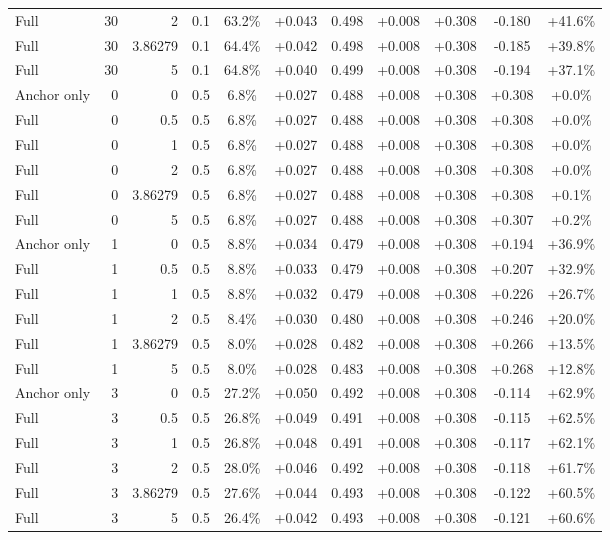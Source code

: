 \begin{table}[htbp]
\begin{tabular}{lrrrccccccc}
Full & 30 & 2 & 0.1 & 63.2\% & +0.043 & 0.498 & +0.008 & +0.308 & -0.180 & +41.6\% \\
Full & 30 & 3.86279 & 0.1 & 64.4\% & +0.042 & 0.498 & +0.008 & +0.308 & -0.185 & +39.8\% \\
Full & 30 & 5 & 0.1 & 64.8\% & +0.040 & 0.499 & +0.008 & +0.308 & -0.194 & +37.1\% \\
Anchor only & 0 & 0 & 0.5 & 6.8\% & +0.027 & 0.488 & +0.008 & +0.308 & +0.308 & +0.0\% \\
Full & 0 & 0.5 & 0.5 & 6.8\% & +0.027 & 0.488 & +0.008 & +0.308 & +0.308 & +0.0\% \\
Full & 0 & 1 & 0.5 & 6.8\% & +0.027 & 0.488 & +0.008 & +0.308 & +0.308 & +0.0\% \\
Full & 0 & 2 & 0.5 & 6.8\% & +0.027 & 0.488 & +0.008 & +0.308 & +0.308 & +0.0\% \\
Full & 0 & 3.86279 & 0.5 & 6.8\% & +0.027 & 0.488 & +0.008 & +0.308 & +0.308 & +0.1\% \\
Full & 0 & 5 & 0.5 & 6.8\% & +0.027 & 0.488 & +0.008 & +0.308 & +0.307 & +0.2\% \\
Anchor only & 1 & 0 & 0.5 & 8.8\% & +0.034 & 0.479 & +0.008 & +0.308 & +0.194 & +36.9\% \\
Full & 1 & 0.5 & 0.5 & 8.8\% & +0.033 & 0.479 & +0.008 & +0.308 & +0.207 & +32.9\% \\
Full & 1 & 1 & 0.5 & 8.8\% & +0.032 & 0.479 & +0.008 & +0.308 & +0.226 & +26.7\% \\
Full & 1 & 2 & 0.5 & 8.4\% & +0.030 & 0.480 & +0.008 & +0.308 & +0.246 & +20.0\% \\
Full & 1 & 3.86279 & 0.5 & 8.0\% & +0.028 & 0.482 & +0.008 & +0.308 & +0.266 & +13.5\% \\
Full & 1 & 5 & 0.5 & 8.0\% & +0.028 & 0.483 & +0.008 & +0.308 & +0.268 & +12.8\% \\
Anchor only & 3 & 0 & 0.5 & 27.2\% & +0.050 & 0.492 & +0.008 & +0.308 & -0.114 & +62.9\% \\
Full & 3 & 0.5 & 0.5 & 26.8\% & +0.049 & 0.491 & +0.008 & +0.308 & -0.115 & +62.5\% \\
Full & 3 & 1 & 0.5 & 26.8\% & +0.048 & 0.491 & +0.008 & +0.308 & -0.117 & +62.1\% \\
Full & 3 & 2 & 0.5 & 28.0\% & +0.046 & 0.492 & +0.008 & +0.308 & -0.118 & +61.7\% \\
Full & 3 & 3.86279 & 0.5 & 27.6\% & +0.044 & 0.493 & +0.008 & +0.308 & -0.122 & +60.5\% \\
Full & 3 & 5 & 0.5 & 26.4\% & +0.042 & 0.493 & +0.008 & +0.308 & -0.121 & +60.6\% \\

\end{tabular}
\end{table}
